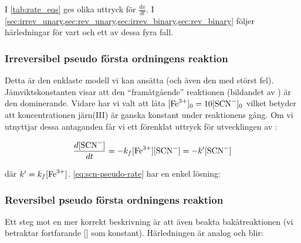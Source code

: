 I \cref{tab:rate_eqs} ges olika uttryck för $\frac{dx}{dt}$. I
\cref{sec:irrev_unary,sec:rev_unary,sec:irrev_binary,sec:rev_binary} 
följer härledningar för vart och ett av dessa fyra fall. 






\subsubsection{Irreversibel pseudo första ordningens reaktion}
\label{sec:irrev_unary}
Detta är den enklaste modell vi kan ansätta (och även den med störst fel).
Jämviktskonstanten visar att den ``framåtgående'' reaktionen (bildandet av )
är den dominerande. Vidare har vi valt att låta $[\ce{Fe^3+}]_0=10[\ce{SCN-}]_0$ vilket
betyder att koncentrationen järn(III) är ganska konstant under reaktionens gång. Om vi
utnyttjar dessa antaganden får vi ett förenklat uttryck för utvecklingen
av :

\begin{equation}
  \label{eq:scn-pseudo-rate}
  \frac{d[\ce{SCN-}]}{dt} = -k_f[\ce{Fe^3+}][\ce{SCN-}] = -k'[\ce{SCN-}]
\end{equation}

där $k' = k_f[\ce{Fe^3+}]$. \cref{eq:scn-pseudo-rate} har en enkel lösning:



\subsubsection{Reversibel pseudo första ordningens reaktion}
\label{sec:rev_unary}
Ett steg mot en mer korrekt beskrivning är att även beakta
bakåtreaktionen (vi betraktar fortfarande [] som
konstant). Härledningen är analog och blir:




